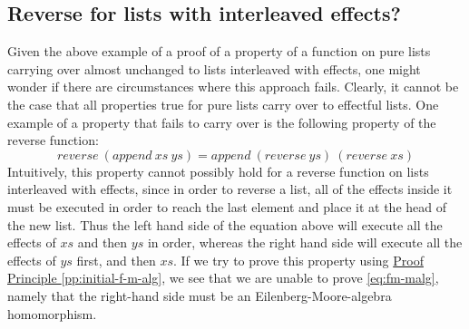 \documentclass{jfp1}
\newcommand{\proofprinref}[1]{\hyperref[#1]{Proof Principle \ref*{#1}}}
\begin{document}
\subsection{Reverse for lists with interleaved effects?}
\label{sec:reverse}

Given the above example of a proof of a property of a function on pure
lists carrying over almost unchanged to lists interleaved with
effects, one might wonder if there are circumstances where this
approach fails. Clearly, it cannot be the case that all properties
true for pure lists carry over to effectful lists. One example of a
property that fails to carry over is the following property of the
reverse function:
\begin{equation}\label{eq:reverse-append}
  \mathit{reverse}~(\mathit{append}~\mathit{xs}~\mathit{ys}) = \mathit{append}~(\mathit{reverse}~\mathit{ys})~(\mathit{reverse}~\mathit{xs})
\end{equation}
Intuitively, this property cannot possibly hold for a reverse function
on lists interleaved with effects, since in order to reverse a list,
all of the effects inside it must be executed in order to reach the
last element and place it at the head of the new list. Thus the left
hand side of the equation above will execute all the effects of
$\mathit{xs}$ and then $\mathit{ys}$ in order, whereas the right hand
side will execute all the effects of $\mathit{ys}$ first, and then
$\mathit{xs}$. If we try to prove this property using
\proofprinref{pp:initial-f-m-alg}, we see that we are unable to prove
\autoref{eq:fm-malg}, namely that the right-hand side must be an
Eilenberg-Moore-algebra homomorphism.
\end{document}
